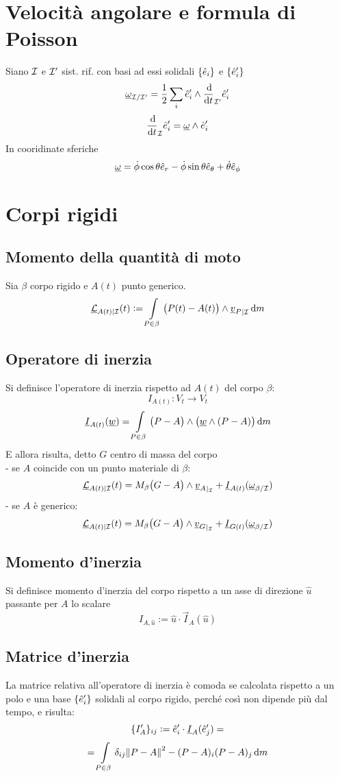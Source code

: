 \documentclass[11pt,landscape,a4paper]{article}
\begin{document}
\begin{multicols}{3}
\section{Velocità angolare e formula di Poisson}
        Siano $\mathcal{I}$ e $\mathcal{I}'$ sist. rif. con basi ad essi solidali $\{\hat{e}_i\}$ e $\{\hat{e}_i'\}$
    $$\vec{\omega}_{\I/\I'} = \frac 1 2 \sum_i \e_i' \wedge \ddt{}_{\I'} \e_i'$$
    $$ \ddt{}_\I \e_i' = \vec{\omega} \wedge \e_i' $$
    In cooridinate sferiche $$ \underline{\omega} = \dot \phi \cos \theta \hat{e}_r - \dot \phi \sin \theta \hat{e}_\theta + \dot \theta \hat{e}_\phi $$

\section{Corpi rigidi}
    \subsection{Momento della quantità di moto}
    Sia $\beta$ corpo rigido e $A(t)$ punto generico.
    $$ \vec{\mathcal{L}}_{A(t)\rvert{\I}}(t) := \int \limits_{P\in \beta} \big (P(t) - A(t) \big) \wedge {\vec{v}_P}_{\rvert \I}\dif m$$
    \subsection{Operatore di inerzia}
    Si definisce l'operatore di inerzia rispetto ad $A(t)$ del corpo $\beta$:
        $$ I_{A(t)} : V_t \longrightarrow V_t$$
        $$ \vec{I}_{A(t)}(\vec w) = \int \limits_{P \in \beta} \big( P- A\big) \wedge \big( \vec w \wedge (P-A)\big) \dif m$$
    E allora risulta, detto $G$ centro di massa del corpo \\
    - se $A$ coincide con un punto materiale di $\beta$:
        $$ \underline{\mathcal{L}}_{A(t)\rvert{\mathcal{I}}}(t) = M_\beta \big(G - A \big) \wedge {\underline{v}_A}_{\rvert_{\mathcal{I}}} + \underline{I}_{A(t)}(\underline{\omega} _{\beta/\mathcal{I}})$$
    - se $A$ è generico:
        $$ \underline{\mathcal{L}}_{A(t)\rvert{\mathcal{I}}}(t) = M_\beta \big(G - A \big) \wedge {\underline{v}_G}_{\rvert_{\mathcal{I}}} + \underline{I}_{G(t)}(\underline{\omega} _{\beta/\mathcal{I}})$$
    \subsection{Momento d'inerzia}
    Si definisce momento d'inerzia del corpo rispetto a un asse di direzione $\hat u$ passante per $A$ lo scalare 
    $$ I_{A, \hat u} := \hat u \cdot \vec{I}_A(\hat u)$$
    \subsection{Matrice d'inerzia}
    La matrice relativa all'operatore di inerzia è comoda se calcolata rispetto a un polo e una base $\{\hat{e}_i'\}$ solidali al corpo rigido, perché così non dipende più dal tempo, e risulta:
        $$\{I'_A\}_{ij} := \hat{e}_i' \cdot \underline{I}_A(\hat{e}_j') = $$ 
        $$ = \int \limits_{P \in \beta} \delta_{ij} \norm{P-A}^2 - (P-A)_i (P-A)_j \dif m$$

\end{multicols}
\end{document}
